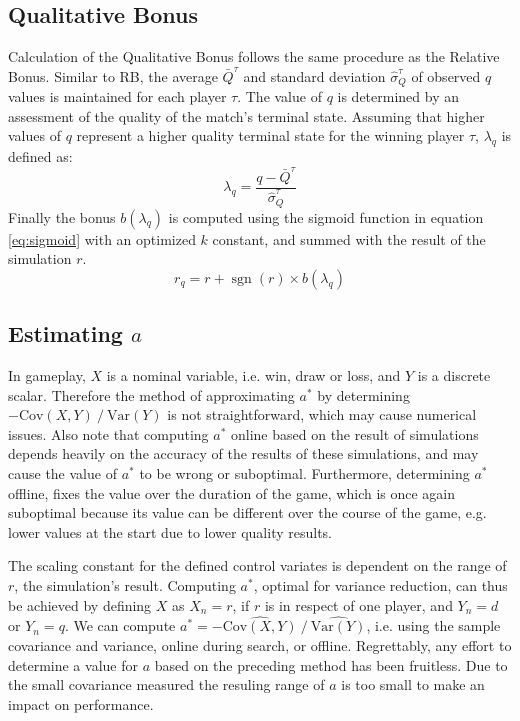 \documentclass{ecai2014}
\newcommand{\sgn}{\mathop{\mathrm{sgn}}}
\newcommand{\Var}[1]{\mathrm{Var}\left( #1 \right)}
\newcommand{\Cov}[1]{\mathrm{Cov}\left( #1 \right)}
\begin{document}
\subsection{Qualitative Bonus}
\label{subsec:qb}
Calculation of the Qualitative Bonus follows the same procedure as the Relative Bonus. Similar to RB, the average $\bar{Q}^\tau$ and standard deviation $\hat{\sigma}^\tau_Q$ of observed $q$ values is maintained for each player $\tau$. The value of $q$ is determined by an assessment of the quality of the match's terminal state. Assuming that higher values of $q$ represent a higher quality terminal state for the winning player $\tau$, $\lambda_q$ is defined as:
\begin{equation}
\lambda_q = \frac{q - \bar{Q}^\tau}{\hat{\sigma}^\tau_Q}
\end{equation}
Finally the bonus $b(\lambda_q)$ is computed using the sigmoid function in equation \ref{eq:sigmoid} with an optimized $k$ constant, and summed with the result of the simulation $r$.
\begin{equation}
r_q=r+\sgn(r)\times b(\lambda_q)
\end{equation}

\subsection{Estimating $a$}
\label{subsec:astar}

In gameplay, $X$ is a nominal variable, i.e. win, draw or loss, and $Y$ is a discrete scalar. Therefore the method of approximating $a^*$ by determining $-\Cov{X,Y}\mathbin{/}\Var{Y}$ is not straightforward, which may cause numerical issues. Also note that computing $a^*$ online based on the result of simulations depends heavily on the accuracy of the results of these simulations, and may cause the value of $a^*$ to be wrong or suboptimal. Furthermore, determining $a^*$ offline, fixes the value over the duration of the game, which is once again suboptimal because its value can be different over the course of the game, e.g. lower values at the start due to lower quality results.

The scaling constant for the defined control variates is dependent on the range of $r$, the simulation's result. Computing $a^*$, optimal for variance reduction, can thus be achieved by defining $X$ as $X_n=r$, if $r$ is in respect of one player, and $Y_n=d$ or $Y_n=q$. We can compute $a^*=-\widehat{\Cov{X,Y}}\mathbin{/}\widehat{\Var{Y}}$, i.e. using the sample covariance and variance, online during search, or offline. Regrettably, any effort to determine a value for $a$ based on the preceding method has been fruitless. Due to the small covariance measured the resuling range of $a$ is too small to make an impact on performance.
\end{document}
